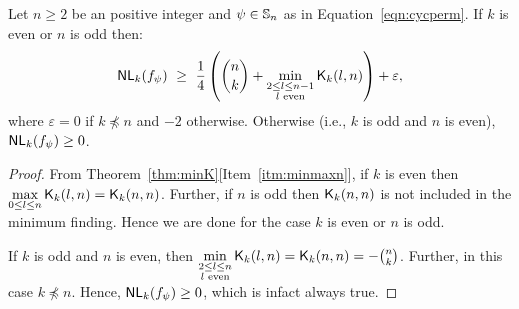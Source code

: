 \documentclass{llncs}
\begin{document}
\begin{corollary}\label{cor:NLk_bound}
	Let $n \geq 2$ be an positive integer and $\psi \in \mathbb{S}_n$ as in Equation~\ref{eqn:cycperm}. If $k$ is even or $n$ is odd then:
	$$\mathsf{NL}_{k}(f_\psi) ~\geq ~ 
	\displaystyle{\frac{1}{4}\left({n \choose k} + \min_{\substack{2 \leq l \leq n-1 \\ l \text{ even}}} \mathsf{K}_{k}(l,n)\right)}  + \varepsilon,$$
	where $\varepsilon =0$ if $k \not\preceq n$ and $-2$ otherwise.
	Otherwise (i.e., $k$ is odd and $n$ is even), $\mathsf{NL}_{k}(f_\psi) \geq 0$.
	
\end{corollary}
\begin{proof}
From Theorem~\ref{thm:minK}[Item~\ref{itm:minmaxn}], if $k$ is even then $\max\limits_{0 \leq l \leq n} \mathsf{K}_{k}(l,n) = \mathsf{K}_{k}(n,n)$. 
Further, if $n$ is odd then $\mathsf{K}_{k}(n,n)$ is not included in the minimum finding. Hence we are done for the case $k$ is even or $n$ is odd.

If $k$ is odd and $n$ is even, then $\min\limits_{\substack{2 \leq l \leq n \\ l \text{ even}}} \mathsf{K}_{k}(l,n) = \mathsf{K}_{k}(n,n) = -{n \choose k}$. Further, in this case $k \not\preceq n$. Hence, $\mathsf{NL}_{k}(f_\psi) \geq 0$, which is infact always true.
\end{proof}
\end{document}

